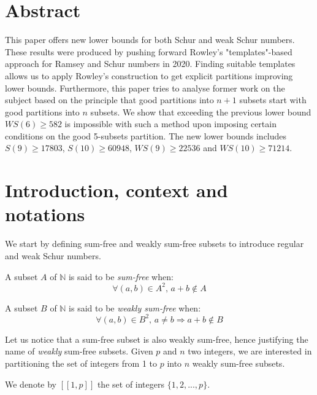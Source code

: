 \section{Abstract}

\qquad This paper offers new lower bounds for both Schur and weak Schur numbers. These results were produced by pushing forward
Rowley's "templates"-based approach for Ramsey and Schur numbers in 2020. Finding suitable templates allows us to apply Rowley's construction 
to get explicit partitions improving lower bounds. Furthermore, this paper tries to analyse former work on the subject based on
the principle that good partitions into \(n+1\) subsets start with good partitions into \(n\) subsets. We show that exceeding
the previous lower bound \(WS(6) \geqslant 582\) is impossible with such a method upon imposing certain conditions on the good
5-subsets partition. The new lower bounds includes\(S(9) \geqslant 17803\), \(S(10) \geqslant 60948\), \(WS(9) \geqslant 22536 \) and \(WS(10) \geqslant 71214 \).

\section{Introduction, context and notations}

We start by defining sum-free and weakly sum-free subsets to introduce regular and weak Schur numbers.

\begin{definition}
A subset \(A\) of \(\mathbb{N}\) is said to be \textit{sum-free} when:
\[ \forall (a,b) \in A^2 \text{, } a+b \notin A\]
\end{definition}

\begin{definition}
A subset \(B\) of \(\mathbb{N}\) is said to be \textit{weakly sum-free} when:
\[ \forall (a,b) \in B^2 \text{, } a \neq b \Longrightarrow a+b \notin B\]
\end{definition}

Let us notice that a sum-free subset is also weakly sum-free, hence justifying the name of \textit{weakly} sum-free
subsets. Given \(p\) and \(n\) two integers, we are interested in partitioning the set of integers from 1 to \(p\) into
\(n\) weakly sum-free subsets.

\begin{notation}
We denote by \([\![1,p]\!]\) the set of integers \(\{1, 2, ..., p\}\).
\end{notation}

